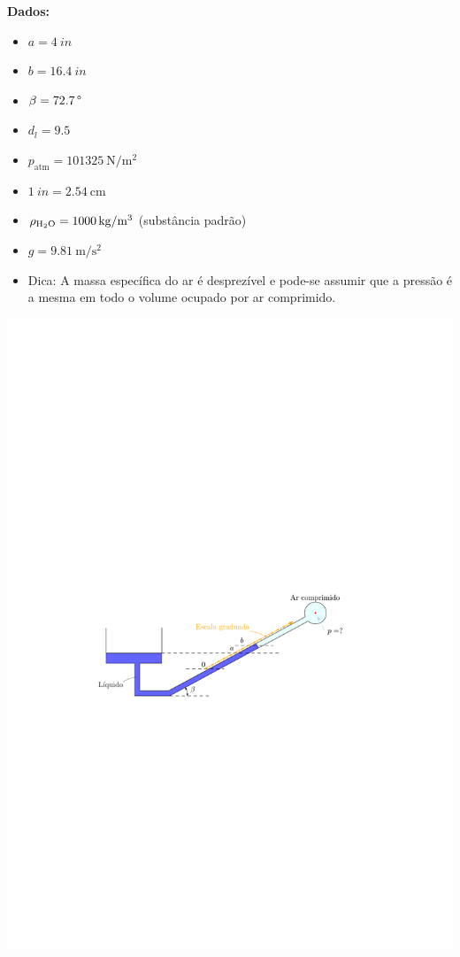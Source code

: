 \documentclass[
	a4paper,
	12pt,
	brazilian
]{article}
\begin{document}
	\textbf{Dados:}
	\begin{itemize}
		\item $a=\SI{4}{in}$
		\item $b=\SI{16.4}{in}$
		\item $\beta=\SI{72.7}{\SIUnitSymbolDegree}$
		\item $d_{l}=9.5$
		\item $p_{\textrm{atm}}=\SI{101325}{\newton/\meter^{2}}$
		\item $\SI{1}{in}=\SI{2.54}{\centi\meter}$
		\item $\rho_{\ce{H2O}}=\SI{1000}{\kilogram/\meter^{3}}$ (substância padrão)
		\item $g=\SI{9.81}{\meter/\second^{2}}$
		\item Dica: A massa específica do ar é desprezível e pode-se assumir que a pressão é a mesma em todo o volume ocupado por ar comprimido.
	\end{itemize}
	\begin{center}
		\includegraphics[width=1\linewidth]{assets/images/ex4}
	\end{center}
\end{document}
